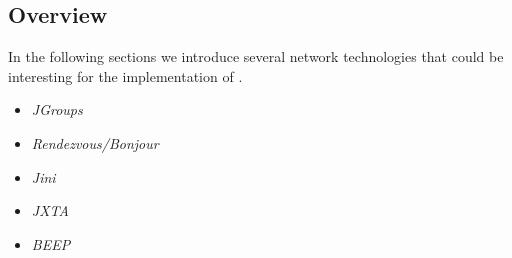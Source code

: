 \documentclass[11pt,a4paper]{article}
\begin{document}
\subsection{Overview}
In the following sections we introduce several network technologies that could be interesting for the implementation of \ace. 

\begin{itemize}
 \item \emph{JGroups}
 \item \emph{Rendezvous/Bonjour}
 \item \emph{Jini}
 \item \emph{JXTA}
 \item \emph{BEEP}
\end{itemize}







\end{document}

